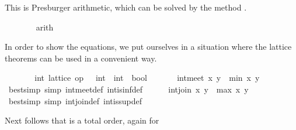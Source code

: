 \begin{isabellebody}
\begin{isamarkuptxt}
\begin{isabelle}
\end{isabelle}
        This is Presburger arithmetic, which can be solved by the
        method .%
\end{isamarkuptxt}%
\isamarkuptrue%
\ \ \ \ \ \ \isamarkupfalse%
\ arith{}%
\begin{isamarkuptxt}%
\normalsize In order to show the equations, we put ourselves
      in a situation where the lattice theorems can be used in a
      convenient way.%
\end{isamarkuptxt}%
\isamarkuptrue%
\ \ \ \ \isamarkupfalse%
\ \isamarkupfalse%
\ int{}\ lattice\ {}op\ {}\ {}{}\ int\ {}\ int\ {}\ bool{}\ \isamarkupfalse%
\isanewline
\ \ \ \ \isamarkupfalse%
\ {}int{}meet\ x\ y\ {}\ min\ x\ y{}\isanewline
\ \ \ \ \ \ \isamarkupfalse%
\ {}bestsimp\ simp{}\ int{}meet{}def\ int{}is{}inf{}def{}\isanewline
\ \ \ \ \isamarkupfalse%
\ {}int{}join\ x\ y\ {}\ max\ x\ y{}\isanewline
\ \ \ \ \ \ \isamarkupfalse%
\ {}bestsimp\ simp{}\ int{}join{}def\ int{}is{}sup{}def{}\isanewline
\ \ \isamarkupfalse%
%
\endisatagvisible
{\isafoldvisible}%
%
\isadelimvisible
%
\endisadelimvisible
%
\begin{isamarkuptext}%
Next follows that  is a total order, again for

\end{isamarkuptext}
\end{isabellebody}
